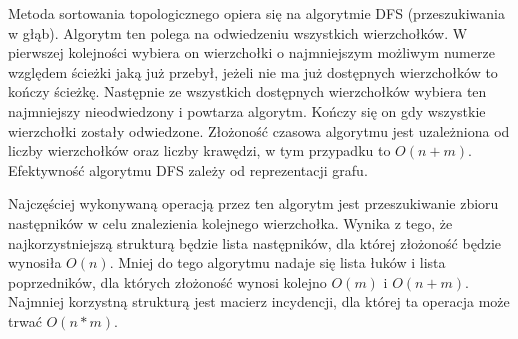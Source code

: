 \documentclass[polish,polish,a4paper]{article}
\begin{document}
\begin{spacing}{1.25}
	\begin{figure}[H]
	
		\centering
	\end{figure}

		
Metoda sortowania topologicznego opiera się na algorytmie DFS (przeszukiwania w głąb). Algorytm ten polega na odwiedzeniu wszystkich wierzchołków. W pierwszej kolejności wybiera on wierzchołki o najmniejszym możliwym numerze względem ścieżki jaką już przebył, jeżeli nie ma już dostępnych wierzchołków to kończy ścieżkę. Następnie ze wszystkich dostępnych wierzchołków wybiera ten najmniejszy nieodwiedzony i powtarza algorytm. Kończy się on gdy wszystkie wierzchołki zostały odwiedzone. Złożoność czasowa algorytmu jest uzależniona od liczby wierzchołków oraz liczby krawędzi, w tym przypadku to $ O(n+m) $. Efektywność algorytmu DFS zależy od reprezentacji grafu. 

Najczęściej wykonywaną operacją przez ten algorytm jest przeszukiwanie zbioru następników w celu znalezienia kolejnego wierzchołka. Wynika z tego, że najkorzystniejszą strukturą będzie lista następników, dla której złożoność będzie wynosiła $ O(n) $. Mniej do tego algorytmu nadaje się lista łuków i lista poprzedników, dla których złożoność wynosi kolejno $ O(m) $ i $ O(n+m) $. Najmniej korzystną strukturą jest macierz incydencji, dla której ta operacja może trwać $ O(n*m) $. 


\end{spacing}
\end{document}
